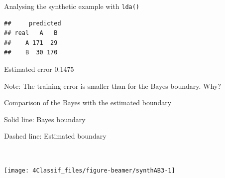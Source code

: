 \documentclass[
  10pt,
  ignorenonframetext,
]{beamer}
\newenvironment{Shaded}{\begin{snugshade}}{\end{snugshade}}
\newcommand{\AttributeTok}[1]{\textcolor[rgb]{0.13,0.29,0.53}{#1}}
\newcommand{\FunctionTok}[1]{\textcolor[rgb]{0.13,0.29,0.53}{\textbf{#1}}}
\newcommand{\NormalTok}[1]{#1}
\newcommand{\OtherTok}[1]{\textcolor[rgb]{0.56,0.35,0.01}{#1}}
\newcommand{\SpecialCharTok}[1]{\textcolor[rgb]{0.81,0.36,0.00}{\textbf{#1}}}
\begin{document}
\begin{frame}[fragile]
\begin{block}{Analysing the synthetic example with \texttt{lda()}}
\protect\hypertarget{analysing-the-synthetic-example-with-lda}{}
\(~\)

\scriptsize

\begin{Shaded}
\end{Shaded}

\begin{verbatim}
##     predicted
## real   A   B
##    A 171  29
##    B  30 170
\end{verbatim}

Estimated error 0.1475 \(~\)

\normalsize

Note: The training error is smaller than for the Bayes boundary. Why?
\end{block}
\end{frame}

\begin{frame}
\begin{block}{Comparison of the Bayes with the estimated boundary}
\protect\hypertarget{comparison-of-the-bayes-with-the-estimated-boundary}{}
\vspace{2mm}

Solid line: Bayes boundary

Dashed line: Estimated boundary

\(~\)

\begin{center}\texttt{[image: 4Classif\_files/figure-beamer/synthAB3-1]} \end{center}
\end{block}
\end{frame}
\end{document}
